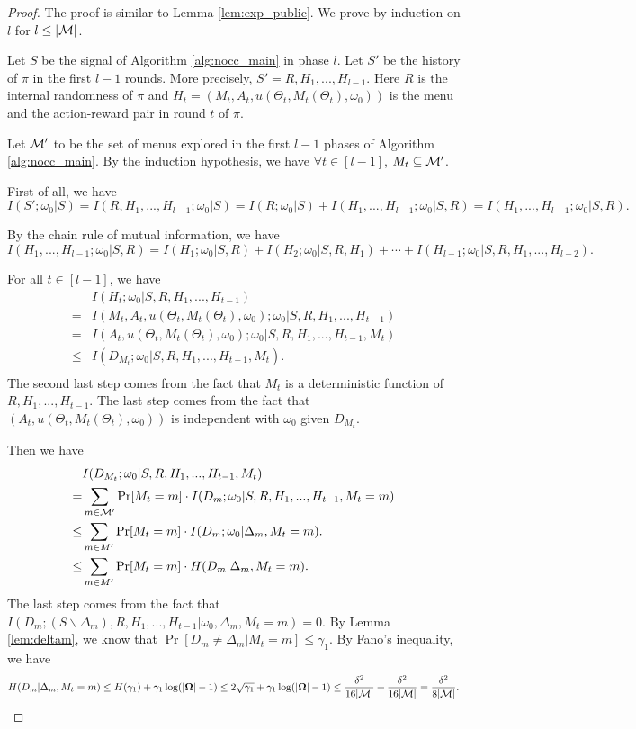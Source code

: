 \begin{proof}
The proof is similar to Lemma \ref{lem:exp_public}. We prove by induction on $l$ for $l \leq |\mathcal{M}|$.


Let $S$ be the signal of Algorithm \ref{alg:nocc_main} in phase $l$. Let $S'$ be the history of $\pi$ in the first $l-1$ rounds. More precisely, $S' = R, H_1,...,H_{l-1}$. Here $R$ is the internal randomness of $\pi$ and $H_t = (M_t, A_t,u(\Theta_t, M_t(\Theta_t), \omega_0))$ is the menu and the action-reward pair in round $t$ of $\pi$.

Let $\mathcal{M}'$ to be the set of menus explored in the first $l-1$ phases of Algorithm \ref{alg:nocc_main}. By the induction hypothesis, we have $\forall t\in[l-1]$, $M_t \subseteq \mathcal{M}'$.

First of all, we have
\[
I(S'; \omega_0| S) = I(R,H_1,...,H_{l-1}; \omega_0| S)  = I(R; \omega_0| S) + I(H_1,...,H_{l-1}; \omega_0|S, R) = I(H_1,...,H_{l-1}; \omega_0|S, R).
\]

By the chain rule of mutual information, we have
\[
 I(H_1,...,H_{l-1}; \omega_0|S, R) = I(H_1;\omega_0|S,R) + I(H_2;\omega_0|S, R ,H_1) + \cdots + I(H_{l-1}; \omega_0|S,R,H_1,...,H_{l-2}).
\]

For all $t \in [l-1]$, we have
\begin{align*}
&I(H_t; \omega_0|S,R,H_1,...,H_{t-1}) \\
=& I(M_t,A_t, u(\Theta_t, M_t(\Theta_t), \omega_0); \omega_0|S,R,H_1,...,H_{t-1}) \\
=& I(A_t, u(\Theta_t, M_t(\Theta_t), \omega_0); \omega_0 | S,R,H_1,...,H_{t-1}, M_t)\\
\leq& I(D_{M_t}; \omega_0|S,R,H_1,...,H_{t-1},M_t). \\
\end{align*}
The second last step comes from the fact that $M_t$ is a deterministic function of $R,H_1,...,H_{t-1}$. The last step comes from the fact that $(A_t,u(\Theta_t, M_t(\Theta_t), \omega_0))$ is independent with $\omega_0$ given $D_{M_t}$.

Then we have
\begin{align*}
& I(D_{M_t}; \omega_0|S,R,H_1,...,H_{t-1},M_t)\\
=& \sum_{m \in \mathcal{M}'} \Pr[M_t = m] \cdot I(D_m;\omega_0 | S,R,H_1,...,H_{t-1},M_t = m)\\
\leq& \sum_{m \in M'} \Pr[M_t = m] \cdot I(D_m;\omega_0| \Delta_m, M_t =m).\\
\leq& \sum_{m \in M'} \Pr[M_t = m] \cdot H(D_m| \Delta_m, M_t =m).
\end{align*}
The last step comes from the fact that $I(D_m; (S\backslash \Delta_m),R,H_1,...,H_{t-1}|\omega_0, \Delta_m, M_t =m) = 0$. By Lemma \ref{lem:deltam}, we know that $\Pr[D_m \neq \Delta_m|M_t = m] \leq \gamma_1$. By Fano's inequality, we have
\[
H(D_m| \Delta_m, M_t =m) \leq H(\gamma_1) + \gamma_1 \log(|\bold{\Omega}| - 1) \leq 2\sqrt{\gamma_1} + \gamma_1 \log(|\bold{\Omega}| - 1)\leq \frac{\delta^2}{16|\mathcal{M}|}+\frac{\delta^2}{16|\mathcal{M}|}  = \frac{\delta^2}{8|\mathcal{M}|}.
\]


\end{proof}
